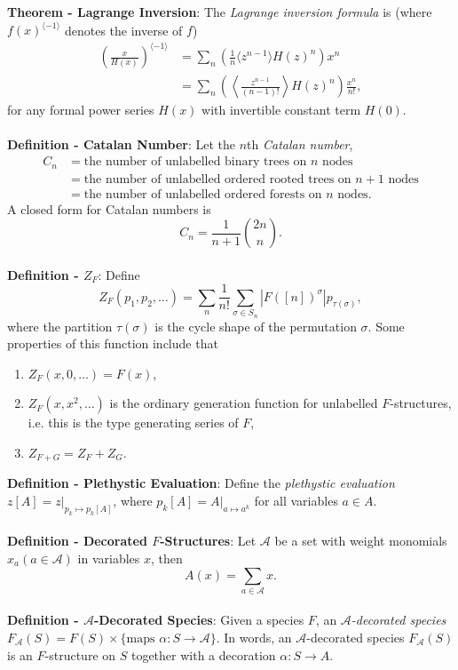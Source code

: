 \documentclass{article}
\begin{document}
\textbf{Theorem - Lagrange Inversion}: The \textit{Lagrange inversion formula} is (where $f(x)^{\langle -1 \rangle}$ denotes the inverse of $f$)\begin{align*}
    \left( \frac{x}{H(x)} \right)^{\langle -1 \rangle} &= \sum_n \left( \frac{1}{n} \langle z^{n - 1}\rangle H(z)^n \right) x^n \\
    &= \sum_n \left( \left\langle \frac{z^{n - 1}}{(n - 1)!} \right\rangle H(z)^n \right) \frac{x^n}{n!},
\end{align*} for any formal power series $H(x)$ with invertible constant term $H(0)$. \\ \\
\textbf{Definition - Catalan Number}: Let the $n$th \textit{Catalan number}, \begin{align*}
    C_n &= \text{the number of unlabelled binary trees on } n \text{ nodes} \\
    &= \text{the number of unlabelled ordered rooted trees on } n + 1 \text{ nodes} \\
    &= \text{the number of unlabelled ordered forests on } n \text{ nodes}.
\end{align*} A closed form for Catalan numbers is $$C_n = \frac{1}{n + 1}{2n \choose n}.$$ \\
\textbf{Definition - $Z_F$}: Define $$Z_F(p_1, p_2, \dots) = \sum_n \frac{1}{n!} \sum_{\sigma \in S_n} |F([n])^\sigma| p_{\tau(\sigma)},$$ where the partition $\tau(\sigma)$ is the cycle shape of the permutation $\sigma$. Some properties of this function include that \begin{enumerate}
    \item $Z_F(x, 0, \dots) = F(x)$,
    \item $Z_F(x, x^2, \dots)$ is the ordinary generation function for unlabelled $F$-structures, i.e. this is the type generating series of $F$,
    \item $Z_{F + G} = Z_F + Z_G$.
\end{enumerate}
\textbf{Definition - Plethystic Evaluation}: Define the \textit{plethystic evaluation} $z[A] = z|_{p_k \mapsto p_k[A]}$, where $p_k[A] = A|_{a \mapsto a^k}$ for all variables $a \in A$. \\ \\
\textbf{Definition - Decorated $F$-Structures}: Let $\mathcal{A}$ be a set with weight monomials $x_a (a \in \mathcal{A})$ in variables $x$, then $$A(x) = \sum_{a \in \mathcal{A}} x.$$ \\
\textbf{Definition - $\mathcal{A}$-Decorated Species}: Given a species $F$, an \textit{$\mathcal{A}$-decorated species} $F_\mathcal{A}(S) = F(S) \times \{\text{maps }\alpha: S \rightarrow \mathcal{A}\}$. In words, an $\mathcal{A}$-decorated species $F_\mathcal{A}(S)$ is an $F$-structure on $S$ together with a decoration $\alpha: S \rightarrow A$. \\ \\
\end{document}
